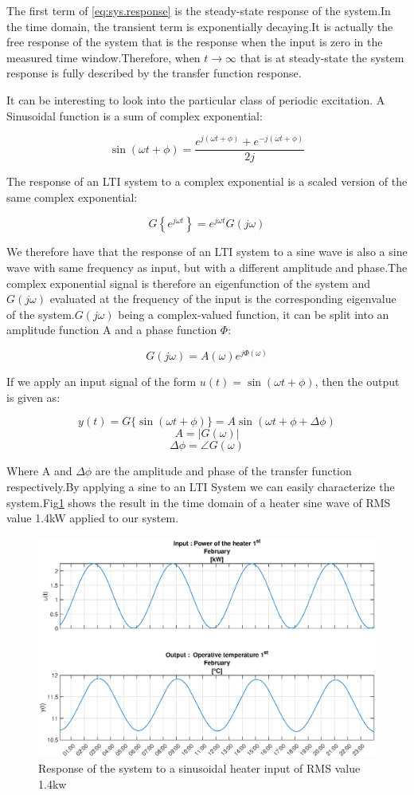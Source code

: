 \documentclass[a4paper,12pt]{article}
\numberwithin{equation}{section}
\begin{document}
The first term of \eqref{eq:sys.response} is the steady-state response of the system.In the time domain, the transient term is exponentially decaying.It is actually the free response of the system that is the response when the input is zero in the measured time window.Therefore, when $t\rightarrow \infty$ that is at steady-state the system response is fully described by the transfer function response.

It can be interesting to look into the particular class of periodic excitation. A Sinusoidal function is a sum of complex exponential:

\[\sin (\omega t+\phi)=\frac{e^{j(\omega t+\phi)}+e^{-j(\omega t+\phi)}}{2 j}\]

The response of an LTI system to a complex exponential  is a scaled version of the same complex
exponential:

\[G\left\{e^{j \omega t}\right\}=e^{j \omega t} G(j \omega)\]

We therefore have that the response of an LTI system to a sine wave is also a sine wave  with same
frequency as input, but with a different amplitude and phase.The complex exponential signal is therefore an eigenfunction of the system and $G(j \omega)$ evaluated at the frequency of the input is the corresponding eigenvalue of the system.$G(j \omega)$ being a complex-valued function, it can be split into an amplitude function A and a phase function $\Phi$:

\[G(j \omega)=A(\omega) e^{j \Phi(\omega)}\]

If we apply an input signal of the form $u(t)=\sin (\omega t+\phi)$, then the output is given as:


\[y(t)=G\{\sin (\omega t+\phi)\} =A \sin (\omega t+\phi+\Delta \phi)\]
\[A =|G(\omega)| \]
\[\Delta \phi =\angle G(\omega)\]

Where A and $\Delta \phi$ are  the amplitude  and phase of the transfer function respectively.By applying a sine to an LTI System we can easily characterize the system.Fig\ref{fig:single sine} shows the result in the time domain of a heater sine wave of RMS value 1.4kW applied to our system.

\begin{figure}[H]
    \includegraphics[scale=0.7]{single_sine_rms_1400.eps}
    \caption{Response of the system to a sinusoidal heater input of RMS value 1.4kw}
    \label{fig:single sine}
\end{figure}
\end{document}
